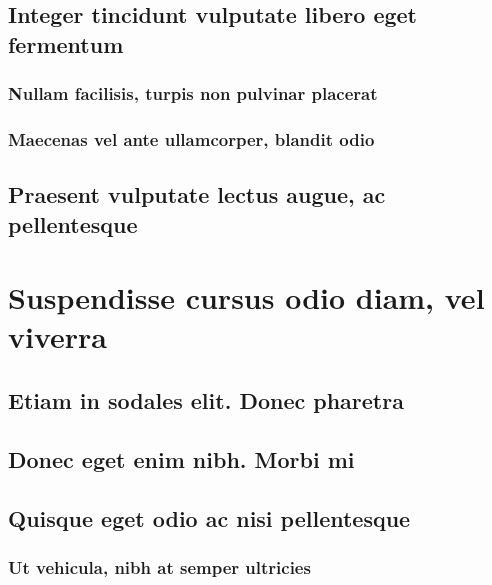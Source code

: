 \documentclass[%
  english,%
]{doctorate}
\begin{document}
\lipsum[1-8]

\subsection{Integer tincidunt vulputate libero eget fermentum}

\lipsum[1-8]

\subsubsection{Nullam facilisis, turpis non pulvinar placerat}

\lipsum[1-8]

\subsubsection{Maecenas vel ante ullamcorper, blandit odio}

\lipsum[1-8]

\subsection{Praesent vulputate lectus augue, ac pellentesque}

\lipsum[1-8]

\section{Suspendisse cursus odio diam, vel viverra}

\lipsum[1-8]

\subsection{Etiam in sodales elit. Donec pharetra}

\lipsum[1-8]

\subsection{Donec eget enim nibh. Morbi mi}

\lipsum[1-8]

\subsection{Quisque eget odio ac nisi pellentesque}

\lipsum[1-8]

\subsubsection{Ut vehicula, nibh at semper ultricies}
\end{document}
